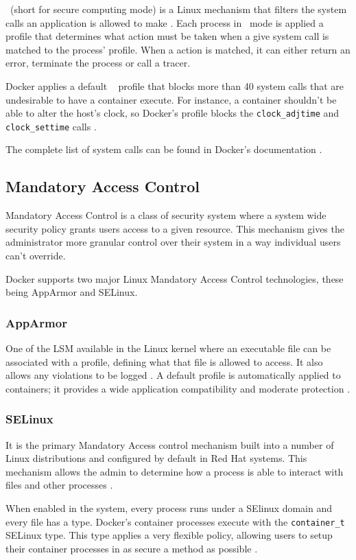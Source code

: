 \seccomp~(short for secure computing mode) is a Linux mechanism that filters the system calls an application is allowed to make \cite{seccomp-man}. Each process in \seccomp~mode is applied a profile that determines what action must be taken when a give system call is matched to the process' profile. When a action is matched, it can either return an error, terminate the process or call a tracer.

Docker applies a default \seccomp~ profile that blocks more than 40 system calls that are undesirable to have a container execute. For instance, a container shouldn't be able to alter the host's clock, so Docker's profile blocks the \texttt{clock\_adjtime} and \texttt{clock\_settime} calls \cite{Rice2020-kl}.

The complete list of system calls can be found in Docker's documentation \cite{docker-seccomp}.


\subsection{Mandatory Access Control}
\label{ssec::security:sel-apparm}

Mandatory Access Control is a class of security system where a system wide security policy grants users access to a given resource. This mechanism gives the administrator more granular control over their system in a way individual users can't override\cite{Belim2018}.

Docker supports two major Linux Mandatory Access Control technologies, these being \textsf{AppArmor} and \textsf{SELinux}.

\subsubsection{\textbf{\sffamily AppArmor}}

One of the \ac{LSM} available in the Linux kernel where an executable file can be associated with a profile, defining what that file is allowed to access. It also allows any violations to be logged \cite{ubuntu-apparmor}. A default profile is automatically applied to containers; it provides a wide application compatibility and moderate protection \cite{docker-apparmor}.

\subsubsection{\textbf{\sffamily SELinux}}

It is the primary Mandatory Access control mechanism built into a number of Linux distributions and configured by default in Red Hat systems. This mechanism allows the admin to determine how a process is able to interact with files and other processes \cite{Rice2020-kl}.

When enabled in the system, every process runs under a \textsf{SElinux} domain and every file has a type. Docker's container processes execute with the \texttt{container\_t} \textsf{SELinux} type. This type applies a very flexible policy, allowing users to setup their container processes in as secure a method as possible \cite{selinux}.
